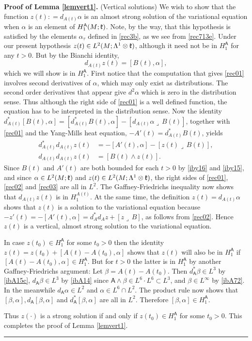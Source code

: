 \documentclass[12pt]{article}
\newenvironment{proof}[1][Proof]{\textbf{#1.} }{\ \rule{0.5em}{0.5em}}
\def \L{\Lambda}
\def \As{\mathsf{A}}
\def \kf{\frak k}
\def \beq{\begin{equation}}
\def \eeq{\end{equation}}
\def \eref{\eqref}
\def \lrc{\lrcorner\,}
\numberwithin{equation}{section}
\begin{document}
\bigskip
\noindent
\begin{proof}[Proof of Lemma \ref{lemvert1}](Vertical solutions) 
We  wish to show that the function $z(t): =d_{A(t)} \alpha$ is an almost strong solution
 of the variational equation when $\alpha$ is an element of $H_1^\As(M; \kf)$.
 Note, by the way, that this hypothesis is satisfied by the elements $\alpha_\tau$ defined in \eref{rec3b},
 as we see from \eref{rec713e}.
Under our present hypothesis $z(t)\in L^2(M;\L^1\otimes \kf)$, although it 
 need not be in $H_1^\As$ for any $t > 0$. But by the Bianchi identity, 
\beq
   d_{A(t)} z(t) = [B(t), \alpha],                                  \label{rec01}
   \eeq
 which we will show  is in $H_1^\As$.  First notice that the computation that gives \eref{rec01}
 involves second derivatives of $\alpha$,  which may only exist as distributions. The second order 
 derivatives that appear give $d^2 \alpha$ which is zero in the distribution sense. 
 Thus although the right side of
 \eref{rec01} is a well defined function, the equation has to be interpreted in the distribution sense.
 Now the identity  $ d_{A(t)}^* [B(t), \alpha] = [d_{A(t)}^* B(t), \alpha]  - [d_{A(t)}\alpha \lrc B(t)]$, 
 together with \eref{rec01} and the Yang-Mills heat equation, $ -A'(t) = d_{A(t)}^* B(t)$, yields
 \begin{align}
  d_{A(t)}^* d_{A(t)} z(t) &= -[A'(t), \alpha]  - [z(t) \lrc B(t)], \label{rec02}\\
   d_{A(t)} d_{A(t)} z(t) &= [B(t)\wedge z(t)].    \label{rec03}
   \end{align}
   Since $B(t)$ and $A'(t)$ are both bounded for each $t >0$ by \eref{iby16} and \eref{iby15}, and
   since $\alpha \in L^2(M;\kf)$ and $z(t) \in L^2(M;\L^1\otimes \kf)$, the right sides of
   \eref{rec01}, \eref{rec02} and \eref{rec03} are all in $L^2$. The Gaffney-Friedrichs
   inequality now shows that $d_{A(t)} z(t)$ is in $H_1^{A(t)}$. At the same time, the definition 
   $z(t) = d_{A(t)} \alpha$ 
   shows that  
   $z(t)$ is a solution to the variational equation because $-z'(t) = -[A'(t), \alpha] =d_A^*d_A z + [z\lrc B]$,
   as follows from \eref{rec02}. Hence $z(t)$ is a vertical, almost strong solution to the variational equation.  
   
   In case $z(t_0) \in H_1^\As$ for some $t_0 > 0$ then the identity $z(t) = z(t_0) + [A(t) - A(t_0), \alpha]$ shows
   that $z(t)$ will also be in $H_1^\As $ if $[A(t) - A(t_0), \alpha] \in H_1^\As$.
   But for $t >0$ the latter is in $H_1^\As$ by another Gaffney-Friedrichs argument: Let $\beta = A(t) - A(t_0)$.
   Then $d_\As^* \beta \in L^3$ by \eref{ibA15c},  $d_\As \beta \in L^3$ by \eref{ibA14} 
   since $\As\wedge \beta \in L^6 \cdot L^6 \subset L^3$,  and $\beta \in L^\infty$ by \eref{ibA72}.
   In the meanwhile $d_\As \alpha \in L^2$ and $\alpha \in L^6\cap L^2$. 
   The product rule now shows that $[\beta, \alpha], d_\As [\beta, \alpha]$ and $d_\As^*[\beta, \alpha]$
   are all in $L^2$. Therefore $[\beta,\alpha] \in H_1^\As$.
      
   Thus $z(\cdot)$ is a strong solution if and only if $z(t_0) \in H_1^\As$ for some $t_0 > 0$. 
               This completes  the proof of Lemma \ref{lemvert1}.                
\end{proof}
\end{document}
